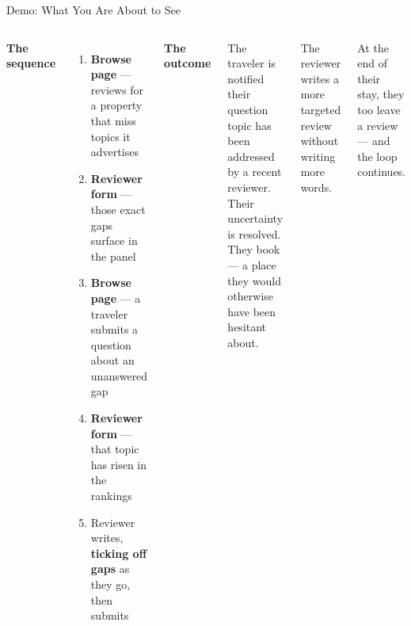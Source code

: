 \documentclass[aspectratio=169,10pt]{beamer}
\newcommand{\shead}[1]{\smallskip\textbf{#1}\par\smallskip}
\begin{document}
\begin{frame}{Demo: What You Are About to See}

\begin{columns}[T]
\shead{The sequence}
\begin{enumerate}
  \item \textbf{Browse page} --- reviews for a property that miss topics it advertises
  \item \textbf{Reviewer form} --- those exact gaps surface in the panel
  \item \textbf{Browse page} --- a traveler submits a question about an unanswered gap
  \item \textbf{Reviewer form} --- that topic has risen in the rankings
  \item Reviewer writes, \textbf{ticking off gaps} as they go, then submits
\end{enumerate}

\shead{The outcome}

The traveler is notified their question topic has been addressed by a recent reviewer.
Their uncertainty is resolved. They book --- a place they would otherwise have been
hesitant about.

\medskip
The reviewer writes a more targeted review without writing more words.

\medskip
At the end of their stay, they too leave a review --- and the loop continues.

\end{columns}

\end{frame}
\end{document}
